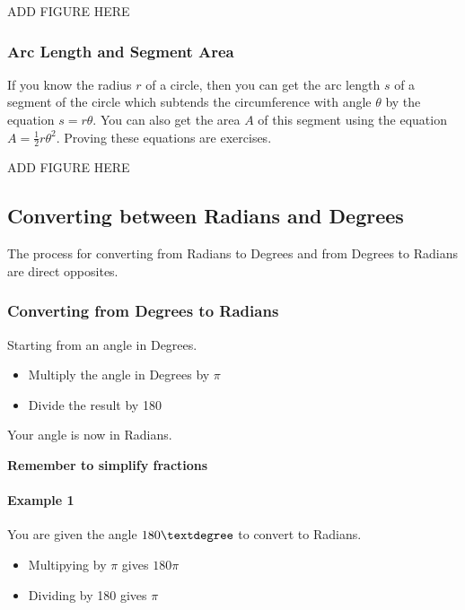 \documentclass[
  12pt,
  a4paper, oneside]{starmastarticle}
\let\oldparagraph\paragraph
\renewcommand{\paragraph}[1]{\oldparagraph{#1}\mbox{}}
\providecommand{\tightlist}{%
  \setlength{\itemsep}{0pt}\setlength{\parskip}{0pt}}\usepackage{longtable,booktabs,array}
\begin{document}
ADD FIGURE HERE

\hypertarget{arc-length-and-segment-area}{%
\subsubsection{Arc Length and Segment
Area}\label{arc-length-and-segment-area}}

If you know the radius \(r\) of a circle, then you can get the arc
length \(s\) of a segment of the circle which subtends the circumference
with angle \(\theta\) by the equation \(s = r\theta\). You can also get
the area \(A\) of this segment using the equation
\(A =\frac12 r \theta^2\). Proving these equations are exercises.

ADD FIGURE HERE

\hypertarget{converting-between-radians-and-degrees}{%
\subsection{Converting between Radians and
Degrees}\label{converting-between-radians-and-degrees}}

The process for converting from Radians to Degrees and from Degrees to
Radians are direct opposites.

\hypertarget{converting-from-degrees-to-radians}{%
\subsubsection{Converting from Degrees to
Radians}\label{converting-from-degrees-to-radians}}

Starting from an angle in Degrees.

\begin{itemize}
\tightlist
\item
  Multiply the angle in Degrees by \(\pi\)
\item
  Divide the result by 180
\end{itemize}

Your angle is now in Radians.

\textbf{Remember to simplify fractions}

\hypertarget{example-1}{%
\paragraph{Example 1}\label{example-1}}

You are given the angle \(180\textdegree\) to convert to Radians.

\begin{itemize}
\tightlist
\item
  Multipying by \(\pi\) gives \(180\pi\)
\item
  Dividing by 180 gives \(\pi\)
\end{itemize}
\end{document}
